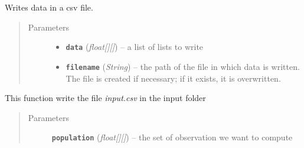 \documentclass[letterpaper,10pt,english]{sphinxmanual}
\begin{document}

\begin{fulllineitems}
\label{data:es.write_data}
Writes data in a csv file.
\begin{quote}\begin{description}
\item[{Parameters}] \leavevmode\begin{itemize}
\item {} 
\textbf{\texttt{data}} (\emph{float{[}{]}{[}{]}}) -- a list of lists to write

\item {} 
\textbf{\texttt{filename}} (\emph{String}) -- the path of the file in which data is written.
The file is created if necessary; if it exists, it is overwritten.

\end{itemize}

\end{description}\end{quote}

\end{fulllineitems}


\begin{fulllineitems}
\label{data:es.write_kmeans_input}
This function write the file \emph{input.csv} in the input folder
\begin{quote}\begin{description}
\item[{Parameters}] \leavevmode
\textbf{\texttt{population}} (\emph{float{[}{]}{[}{]}}) -- the set of observation we want to compute

\end{description}\end{quote}

\end{fulllineitems}

\end{document}
